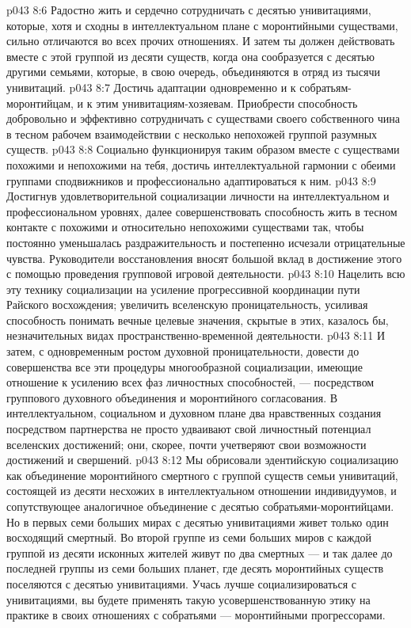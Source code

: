 \vs p043 8:6 \bibnobreakspace Радостно жить и сердечно сотрудничать с десятью унивитациями, которые, хотя и сходны в интеллектуальном плане с моронтийными существами, сильно отличаются во всех прочих отношениях. И затем ты должен действовать вместе с этой группой из десяти существ, когда она сообразуется с десятью другими семьями, которые, в свою очередь, объединяются в отряд из тысячи унивитаций.
\vs p043 8:7 \bibnobreakspace Достичь адаптации одновременно и к собратьям\hyp{}моронтийцам, и к этим унивитациям\hyp{}хозяевам. Приобрести способность добровольно и эффективно сотрудничать с существами своего собственного чина в тесном рабочем взаимодействии с несколько непохожей группой разумных существ.
\vs p043 8:8 \bibnobreakspace Социально функционируя таким образом вместе с существами похожими и непохожими на тебя, достичь интеллектуальной гармонии с обеими группами сподвижников и профессионально адаптироваться к ним.
\vs p043 8:9 \bibnobreakspace Достигнув удовлетворительной социализации личности на интеллектуальном и профессиональном уровнях, далее совершенствовать способность жить в тесном контакте с похожими и относительно непохожими существами так, чтобы постоянно уменьшалась раздражительность и постепенно исчезали отрицательные чувства. Руководители восстановления вносят большой вклад в достижение этого с помощью проведения групповой игровой деятельности.
\vs p043 8:10 \bibnobreakspace Нацелить всю эту технику социализации на усиление прогрессивной координации пути Райского восхождения; увеличить вселенскую проницательность, усиливая способность понимать вечные целевые значения, скрытые в этих, казалось бы, незначительных видах пространственно\hyp{}временной деятельности.
\vs p043 8:11 \bibnobreakspace И затем, с одновременным ростом духовной проницательности, довести до совершенства все эти процедуры многообразной социализации, имеющие отношение к усилению всех фаз личностных способностей, --- посредством группового духовного объединения и моронтийного согласования. В интеллектуальном, социальном и духовном плане два нравственных создания посредством партнерства не просто удваивают свой личностный потенциал вселенских достижений; они, скорее, почти учетверяют свои возможности достижений и свершений.
\vs p043 8:12 \pc Мы обрисовали эдентийскую социализацию как объединение моронтийного смертного с группой существ семьи унивитаций, состоящей из десяти несхожих в интеллектуальном отношении индивидуумов, и сопутствующее аналогичное объединение с десятью собратьями\hyp{}моронтийцами. Но в первых семи больших мирах с десятью унивитациями живет только один восходящий смертный. Во второй группе из семи больших миров с каждой группой из десяти исконных жителей живут по два смертных --- и так далее до последней группы из семи больших планет, где десять моронтийных существ поселяются с десятью унивитациями. Учась лучше социализироваться с унивитациями, вы будете применять такую усовершенствованную этику на практике в своих отношениях с собратьями --- моронтийными прогрессорами.
